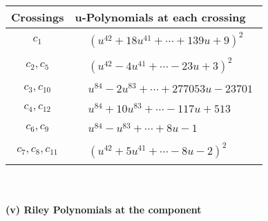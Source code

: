 \documentclass[1p]{elsarticle_modified}
\theoremstyle{definition}
\begin{document}
\begin{tabular}{m{50pt}|m{274pt}}
Crossings & \hspace{64pt}u-Polynomials at each crossing \\
\hline $$\begin{aligned}c_{1}\end{aligned}$$&$\begin{aligned}
&(u^{42}+18 u^{41}+\cdots+139 u+9)^{2}
\end{aligned}$\\
\hline $$\begin{aligned}c_{2},c_{5}\end{aligned}$$&$\begin{aligned}
&(u^{42}-4 u^{41}+\cdots-23 u+3)^{2}
\end{aligned}$\\
\hline $$\begin{aligned}c_{3},c_{10}\end{aligned}$$&$\begin{aligned}
&u^{84}-2 u^{83}+\cdots+277053 u-23701
\end{aligned}$\\
\hline $$\begin{aligned}c_{4},c_{12}\end{aligned}$$&$\begin{aligned}
&u^{84}+10 u^{83}+\cdots-117 u+513
\end{aligned}$\\
\hline $$\begin{aligned}c_{6},c_{9}\end{aligned}$$&$\begin{aligned}
&u^{84}- u^{83}+\cdots+8 u-1
\end{aligned}$\\
\hline $$\begin{aligned}c_{7},c_{8},c_{11}\end{aligned}$$&$\begin{aligned}
&(u^{42}+5 u^{41}+\cdots-8 u-2)^{2}
\end{aligned}$\\
\hline
\end{tabular}\\~\\
\newpage\renewcommand{\arraystretch}{1}
\flushleft \textbf{(v) Riley Polynomials at the component}\newline \\
\end{document}
